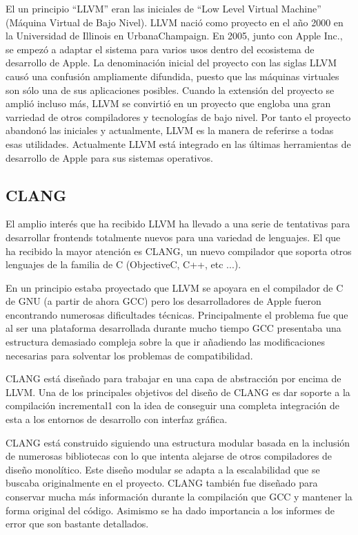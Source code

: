 El un principio ``LLVM'' eran las iniciales de ``Low Level Virtual Machine'' (M\'aquina Virtual de Bajo Nivel). LLVM naci\'o como proyecto en el a\~no 2000 en la Universidad de Illinois en UrbanaChampaign. En 2005, junto con Apple Inc., se empez\'o a adaptar el sistema para varios usos dentro del ecosistema de desarrollo de Apple. La denominaci\'on inicial del proyecto con las siglas LLVM caus\'o una confusi\'on ampliamente difundida, puesto que las m\'aquinas virtuales son s\'olo una de sus aplicaciones posibles. Cuando la extensi\'on del proyecto se ampli\'o incluso m\'as, LLVM se convirti\'o en un proyecto que engloba una gran varriedad de otros compiladores y tecnolog\'ias de bajo nivel. Por tanto el proyecto abandon\'o las iniciales y actualmente, LLVM es la manera de referirse a todas esas utilidades. Actualmente LLVM est\'a integrado en las \'ultimas herramientas de desarrollo de Apple para sus sistemas operativos.

\subsection{CLANG}

El amplio inter\'es que ha recibido LLVM ha llevado a una serie de tentativas para desarrollar frontends totalmente nuevos para una variedad de lenguajes. El que ha recibido la mayor atenci\'on es CLANG, un nuevo compilador que soporta otros lenguajes de la familia de C (ObjectiveC, C++, etc ...).

En un principio estaba proyectado que LLVM se apoyara en el compilador de C de GNU (a partir de ahora GCC) pero los desarrolladores de Apple fueron encontrando numerosas dificultades t\'ecnicas. Principalmente el problema fue que al ser una plataforma desarrollada durante mucho tiempo GCC presentaba una estructura demasiado compleja sobre la que ir a\~nadiendo las modificaciones necesarias para solventar los problemas de compatibilidad.

CLANG est\'a dise\~nado para trabajar en una capa de abstracci\'on por encima de LLVM. Una de los principales objetivos del dise\~no de CLANG es dar soporte a la compilaci\'on incremental1 con la idea de conseguir una completa integraci\'on de esta a los entornos de desarrollo con interfaz gr\'afica.

CLANG est\'a construido siguiendo una estructura modular basada en la inclusi\'on de numerosas bibliotecas con lo que intenta alejarse de otros compiladores de dise\~no monol\'itico. Este dise\~no modular se adapta a la escalabilidad que se buscaba originalmente en el proyecto. CLANG tambi\'en fue dise\~nado para conservar mucha m\'as informaci\'on durante la compilaci\'on que GCC y mantener la forma original del c\'odigo. Asimismo se ha dado importancia a los informes de error que son bastante detallados.

